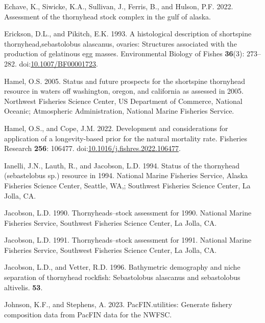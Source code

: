 \documentclass[11pt,
  letterpaper,
]{article}
\newlength{\cslhangindent}
\newenvironment{CSLReferences}[2] %
 {%
  \setlength{\parindent}{0pt}
  \ifodd #1 \everypar{\setlength{\hangindent}{\cslhangindent}}\ignorespaces\fi
  \ifnum #2 > 0
  \setlength{\parskip}{#2\baselineskip}
  \fi
 }%
 {}
\begin{document}
\begin{CSLReferences}{1}{0}
\leavevmode{}%
Echave, K., Siwicke, K.A., Sullivan, J., Ferris, B., and Hulson, P.F. 2022. Assessment of the thornyhead stock complex in the gulf of alaska.

\leavevmode{}%
Erickson, D.L., and Pikitch, E.K. 1993. A histological description of shortspine thornyhead,sebastolobus alascanus, ovaries: Structures associated with the production of gelatinous egg masses. Environmental Biology of Fishes \textbf{36}(3): 273--282. doi:\href{https://doi.org/10.1007/BF00001723}{10.1007/BF00001723}.

\leavevmode{}%
Hamel, O.S. 2005. Status and future prospects for the shortspine thornyhead resource in waters off washington, oregon, and california as assessed in 2005. Northwest Fisheries Science Center, US Department of Commerce, National Oceanic; Atmospheric Administration, National Marine Fisheries Service.

\leavevmode{}%
Hamel, O.S., and Cope, J.M. 2022. Development and considerations for application of a longevity-based prior for the natural mortality rate. Fisheries Research \textbf{256}: 106477. doi:\href{https://doi.org/10.1016/j.fishres.2022.106477}{10.1016/j.fishres.2022.106477}.

\leavevmode{}%
Ianelli, J.N., Lauth, R., and Jacobson, L.D. 1994. Status of the thornyhead (sebastelobus sp.) resource in 1994. National Marine Fisheries Service, Alaska Fisheries Science Center, Seattle, {WA},; Southwest Fisheries Science Center, La Jolla, {CA}.

\leavevmode{}%
Jacobson, L.D. 1990. Thornyheads--stock assessment for 1990. National Marine Fisheries Service, Southwest Fisheries Science Center, La Jolla, {CA}.

\leavevmode{}%
Jacobson, L.D. 1991. Thornyheads--stock assessment for 1991. National Marine Fisheries Service, Southwest Fisheries Science Center, La Jolla, {CA}.

\leavevmode{}%
Jacobson, L.D., and Vetter, R.D. 1996. Bathymetric demography and niche separation of thornyhead rockfish: Sebastolobus alascanus and sebastolobus altivelis. \textbf{53}.

\leavevmode{}%
Johnson, K.F., and Stephens, A. 2023. PacFIN.utilities: Generate fishery composition data from PacFIN data for the NWFSC.


\end{CSLReferences}
\end{document}
